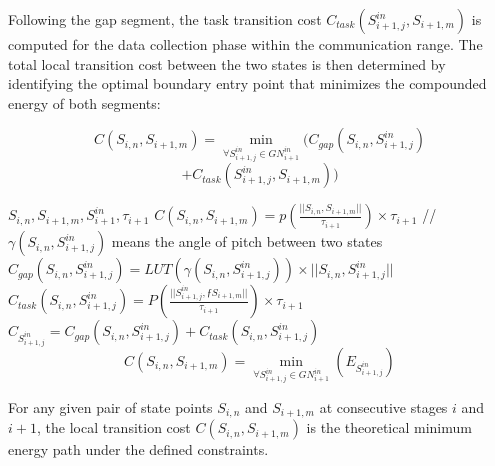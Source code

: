 Following the gap segment, the task transition cost $C_{task}(S^{in}_{i+1,j},S_{i+1,m})$ is computed for the data collection phase within the communication range.
The total local transition cost between the two states is then determined by identifying the optimal boundary entry point that minimizes the compounded energy of both segments:

\[C(S_{i,n},S_{i+1,m}) = \min_{\forall S^{in}_{i+1,j}\in GN^{in}_{i+1}}(C_{gap}(S_{i,n},S^{in}_{i+1,j})\]
\[+C_{task}(S^{in}_{i+1,j},S_{i+1,m}))\]


\begin{algorithm}
    \caption{local transition cost calculation between two states}\label{alg:local_transition_cost}  
    \begin{algorithmic}[1]
        \Require $S_{i,n},S_{i+1,m},S^{in}_{i+1},\tau_{i+1}$
            \State $C(S_{i,n},S_{i+1,m})=p \left(\frac{||S_{i,n},S_{i+1,m}||}{\tau_{i+1}}\right)\times \tau_{i+1}$
        \Else
            \State //$\gamma(S_{i,n},S^{in}_{i+1,j})$ means the angle of pitch between two states
                \State $C_{gap}(S_{i,n},S^{in}_{i+1,j}) = LUT(\gamma(S_{i,n},S^{in}_{i+1,j}))\times ||S_{i,n},S^{in}_{i+1,j}||$
                \State $C_{task}(S_{i,n},S^{in}_{i+1,j}) = P \left(\frac{||S^{in}_{i+1,j},ƒS_{i+1,m}||}{\tau_{i+1}}\right)\times \tau_{i+1}$
                \State $C_{S^{in}_{i+1,j}} = C_{gap}(S_{i,n},S^{in}_{i+1,j})+ C_{task}(S_{i,n},S^{in}_{i+1,j})$
            \EndFor
            \State $$C(S_{i,n},S_{i+1,m}) = \min_{\forall S^{in}_{i+1,j}\in GN^{in}_{i+1}}(E_{S^{in}_{i+1,j}})$$
        \EndIf
    \end{algorithmic}
\end{algorithm}

\begin{lemma}
    For any given pair of state points $S_{i,n}$ and $S_{i+1,m}$ at consecutive stages $i$ and $i+1$, the local transition cost $C(S_{i,n}, S_{i+1,m})$ is the theoretical minimum energy path under the defined constraints.
\end{lemma}

